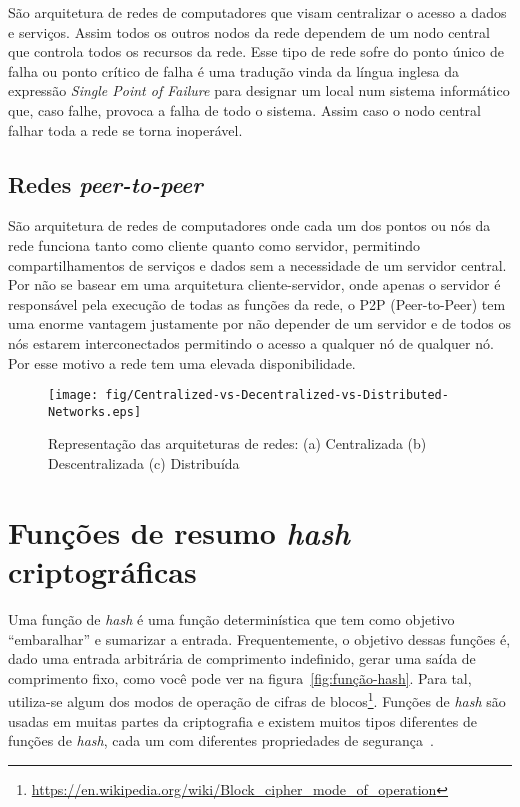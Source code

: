 São arquitetura de redes de computadores que visam centralizar o acesso a dados e serviços.
Assim todos os outros nodos da rede dependem de um nodo central que controla todos os recursos da rede.
Esse tipo de rede sofre do ponto único de falha ou ponto crítico de falha é uma tradução vinda da língua inglesa da expressão \textit{Single Point of Failure} para designar um local num sistema informático que, caso falhe, provoca a falha de todo o sistema.
Assim caso o nodo central falhar toda a rede se torna inoperável.

\subsection{Redes \textit{peer-to-peer}}

São arquitetura de redes de computadores onde cada um dos pontos ou nós da rede funciona tanto como cliente quanto como servidor, permitindo compartilhamentos de serviços e dados sem a necessidade de um servidor central.
Por não se basear em uma arquitetura cliente-servidor, onde apenas o servidor é responsável pela execução de todas as funções da rede, o P2P (Peer-to-Peer) tem uma enorme vantagem justamente por não depender de um servidor e de todos os nós estarem interconectados permitindo o acesso a qualquer nó de qualquer nó. 
Por esse motivo a rede tem uma elevada disponibilidade.%
\begin{figure}[htb!]
\centering\texttt{[image: fig/Centralized-vs-Decentralized-vs-Distributed-Networks.eps]}
\caption[Representação das arquiteturas de redes]
        {\label{fig:tipos-de-redes}Representação das arquiteturas de redes: (a) Centralizada (b) Descentralizada 
        (c) Distribuída~\cite{Imagem1} }
\end{figure}

\section{Funções de resumo \textit{hash} criptográficas}

Uma função de \textit{hash} é uma função determinística que tem como objetivo ``embaralhar'' e sumarizar a entrada.
Frequentemente, o objetivo dessas funções é, dado uma entrada arbitrária de comprimento indefinido, gerar uma saída de comprimento fixo, como você pode ver na figura~\ref{fig:função-hash}.
Para tal, utiliza-se algum dos modos de operação de cifras de blocos\footnote{\url{https://en.wikipedia.org/wiki/Block_cipher_mode_of_operation}}.
Funções de \textit{hash} são usadas em muitas partes da criptografia e existem muitos tipos diferentes de funções de \textit{hash}, cada um com diferentes propriedades de segurança~\cite{HASH1}.

